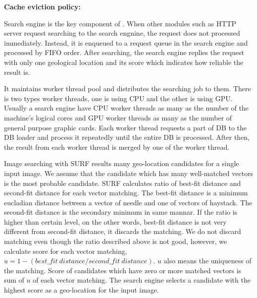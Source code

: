 \textbf{Cache eviction policy:}

Search engine is the key component of \name{}.
When other modules such as HTTP server request searching to the search engnine, the request does not processed immediately.
Instead, it is enqueued to a request queue in the search engine and processed by FIFO order.
After searching, the search engine replies the request with only one geological location and its score which indicates how reliable the result is.

It maintains worker thread pool and distributes the searching job to them.
There is two types worker threads, one is using CPU and the other is using GPU.
Usually a search engine have CPU worker threads as many as the number of the machine's logical cores and GPU worker threads as many as the number of general purpose graphic cards.
Each worker thread requests a part of DB to the DB loader and process it repeatedly until the entire DB is processed.
After then, the result from each worker thread is merged by one of the worker thread.

Image searching with SURF results many geo-location candidates for a single input image.
We assume that the candidate which has many well-matched vectors is the most probable candidate.
SURF calculates ratio of best-fit distance and second-fit distance for each vector matching.
The best-fit distance is a minimum eucladian distance between a vector of needle and one of vectors of haystack.
The second-fit distance is the secondary minimum in same mannar.
If the ratio is higher than certain level, on the other words, best-fit distance is not very different from second-fit distance, it discards the matching.
We do not discard matching even though the ratio described above is not good, however, we calculate score for each vector matching,
$u = 1 - (best\_fit\ distance / second\_fit\ distance)$.
$u$ also means the uniqueness of the matching.
Score of candidates which have zero or more matched vectors is sum of $u$ of each vector matching.
The search engine selects a candidate with the highest score as a geo-location for the input image.


